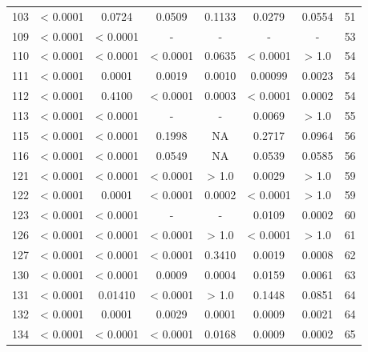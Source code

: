 {\begin{longtable}{cccccccc}
103 & {\color{red} < 0.0001} & 0.0724 & 0.0509 & 0.1133 & {\color{red}0.0279} & 0.0554 & 51 \\
109 & {\color{red} < 0.0001} & {\color{red} < 0.0001} & - & - & - & - & 53 \\
110 & {\color{red} < 0.0001} & {\color{red} < 0.0001} & {\color{red} < 0.0001} & 0.0635 & {\color{red} < 0.0001} & > 1.0 & 54 \\
111 & {\color{red} < 0.0001} & {\color{red}0.0001} & {\color{red}0.0019} & {\color{red}0.0010} & {\color{red}0.00099} & {\color{red}0.0023} & 54 \\
112 & {\color{red} < 0.0001} & {\color{red}0.4100} & {\color{red} < 0.0001} & {\color{red}0.0003} & {\color{red} < 0.0001} & {\color{red}0.0002} & 54 \\
113 & {\color{red} < 0.0001} & {\color{red} < 0.0001} & - & - & {\color{red}0.0069} & > 1.0 & 55 \\
115 & {\color{red} < 0.0001} & {\color{red} < 0.0001} & 0.1998 & NA & 0.2717 & 0.0964 & 56 \\
116 & {\color{red} < 0.0001} & {\color{red} < 0.0001} & 0.0549 & NA & 0.0539 & 0.0585 & 56 \\
121 & {\color{red} < 0.0001} & {\color{red} < 0.0001} & {\color{red} < 0.0001} & > 1.0 & {\color{red}0.0029} & > 1.0 & 59 \\
122 & {\color{red} < 0.0001} & {\color{red}0.0001} & {\color{red} < 0.0001} & {\color{red}0.0002} & {\color{red} < 0.0001} & > 1.0 & 59 \\
123 & {\color{red} < 0.0001} & {\color{red} < 0.0001} & - & - & {\color{red}0.0109} & {\color{red}0.0002} & 60 \\
126 & {\color{red} < 0.0001} & {\color{red} < 0.0001} & {\color{red} < 0.0001} & > 1.0 & {\color{red} < 0.0001} & > 1.0 & 61 \\
127 & {\color{red} < 0.0001} & {\color{red} < 0.0001} & {\color{red} < 0.0001} & 0.3410 & {\color{red}0.0019} & {\color{red}0.0008} & 62 \\
130 & {\color{red} < 0.0001} & {\color{red} < 0.0001} & {\color{red}0.0009} & {\color{red}0.0004} & {\color{red}0.0159} & {\color{red}0.0061} & 63 \\
131 & {\color{red} < 0.0001} & {\color{red}0.01410} & {\color{red} < 0.0001} & > 1.0 & 0.1448 & 0.0851 & 64 \\
132 & {\color{red} < 0.0001} & {\color{red}0.0001} & {\color{red}0.0029} & {\color{red}0.0001} & {\color{red}0.0009} & {\color{red}0.0021} & 64 \\
134 & {\color{red} < 0.0001} & {\color{red} < 0.0001} & {\color{red} < 0.0001} & {\color{red}0.0168} & {\color{red}0.0009} & {\color{red}0.0002} & 65 \\

\end{longtable}}
